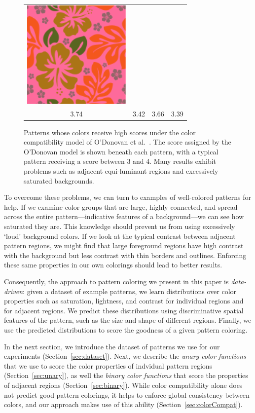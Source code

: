 \begin{figure}[htb]
\begin{tabular}{cccc}
\includegraphics[width=.2\columnwidth]{figs/colorCompat/r_1_3_3-39}\\
3.74&3.42&3.66&3.39\\
\end{tabular}
\caption{Patterns whose colors receive high scores under the color compatibility model of O'Donovan et al.~. The score assigned by the O'Donovan model is shown beneath each pattern, with a typical pattern receiving a score between 3 and 4. Many results exhibit problems such as adjacent equi-luminant regions and excessively saturated backgrounds.}
\label{fig:ColorCompatOnly}
\end{figure}

To overcome these problems, we can turn to examples of well-colored patterns for help. If we examine color groups that are large, highly connected, and spread across the entire pattern---indicative features of a background---we can see how saturated they are. This knowledge should prevent us from using excessively `loud' background colors. If we look at the typical contrast between adjacent pattern regions, we might find that large foreground regions have high contrast with the background but less contrast with thin borders and outlines. Enforcing these same properties in our own colorings should lead to better results.

Consequently, the approach to pattern coloring we present in this paper is \emph{data-driven}: given a dataset of example patterns, we learn distributions over color properties such as saturation, lightness, and contrast for individual regions and for adjacent regions. We predict these distributions using discriminative spatial features of the pattern, such as the size and shape of different regions. Finally, we use the predicted distributions to score the goodness of a given pattern coloring.

In the next section, we introduce the dataset of patterns we use for our experiments (Section~\ref{sec:dataset}). Next, we describe the \emph{unary color functions} that we use to score the color properties of indvidual pattern regions (Section~\ref{sec:unary}), as well the \emph{binary color functions} that score the properties of adjacent regions (Section~\ref{sec:binary}). While color compatibility alone does not predict good pattern colorings, it helps to enforce global consistency between colors, and our approach makes use of this ability (Section~\ref{sec:colorCompat}).

